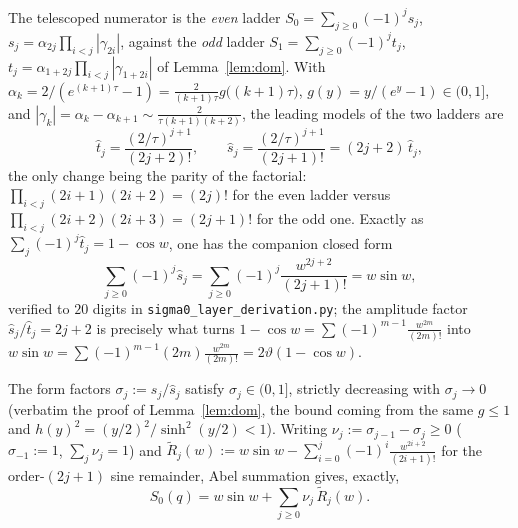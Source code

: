 The telescoped numerator is the \emph{even} ladder
$S_0=\sum_{j\ge0}(-1)^{j}s_j$, $s_j=\alpha_{2j}\prod_{i<j}|\gamma_{2i}|$, against the
\emph{odd} ladder $S_1=\sum_{j\ge0}(-1)^{j}t_j$, $t_j=\alpha_{1+2j}\prod_{i<j}|\gamma_{1+2i}|$
of Lemma~\ref{lem:dom}. With $\alpha_k=2/(e^{(k+1)\tau}-1)=\tfrac{2}{(k+1)\tau}g\!\big((k{+}1)\tau\big)$,
$g(y)=y/(e^y-1)\in(0,1]$, and $|\gamma_k|=\alpha_k-\alpha_{k+1}\sim\tfrac{2}{\tau(k+1)(k+2)}$,
the leading models of the two ladders are
\begin{equation}\label{eq:hatS0}
  \hat t_j=\frac{(2/\tau)^{j+1}}{(2j+2)!},\qquad
  \hat s_j=\frac{(2/\tau)^{j+1}}{(2j+1)!}=(2j+2)\,\hat t_j,
\end{equation}
the only change being the parity of the factorial: $\prod_{i<j}(2i{+}1)(2i{+}2)=(2j)!$ for
the even ladder versus $\prod_{i<j}(2i{+}2)(2i{+}3)=(2j+1)!$ for the odd one. Exactly as
$\sum_j(-1)^j\hat t_j=1-\cos w$, one has the companion closed form
\begin{equation}\label{eq:wsinw}
  \sum_{j\ge0}(-1)^{j}\hat s_j
  =\sum_{j\ge0}(-1)^{j}\frac{w^{2j+2}}{(2j+1)!}
  =w\sin w ,
\end{equation}
verified to $20$ digits in \texttt{sigma0\_layer\_derivation.py}; the amplitude factor
$\hat s_j/\hat t_j=2j+2$ is precisely what turns $1-\cos w=\sum(-1)^{m-1}\tfrac{w^{2m}}{(2m)!}$
into $w\sin w=\sum(-1)^{m-1}(2m)\tfrac{w^{2m}}{(2m)!}=2\vartheta(1-\cos w)$.

\begin{lemma}\label{lem:numred}
The form factors $\sigma_j:=s_j/\hat s_j$ satisfy $\sigma_j\in(0,1]$, strictly decreasing
with $\sigma_j\to0$ \textup(verbatim the proof of Lemma~\ref{lem:dom}, the bound coming from
the same $g\le1$ and $h(y)^2=(y/2)^2/\sinh^2(y/2)<1$\textup). Writing
$\nu_j:=\sigma_{j-1}-\sigma_j\ge0$ \textup($\sigma_{-1}:=1$, $\sum_j\nu_j=1$\textup) and
$\widetilde R_j(w):=w\sin w-\sum_{i=0}^{j}(-1)^{i}\tfrac{w^{2i+2}}{(2i+1)!}$ for the
order-$(2j{+}1)$ sine remainder, Abel summation gives, exactly,
\begin{equation}\label{eq:numred}
  S_0(q)=w\sin w+\sum_{j\ge0}\nu_j\,\widetilde R_j(w).
\end{equation}
\end{lemma}

